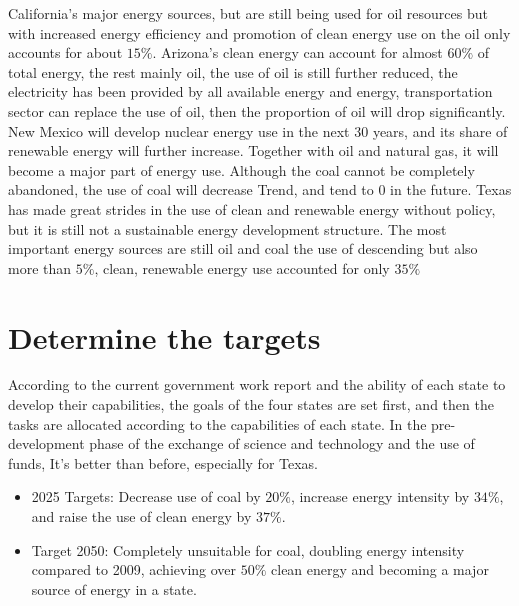 \documentclass{mcmthesis}
\begin{document}
\begin{itemize}
  California's major energy sources, but are still being used for oil resources but with increased energy efficiency and promotion of
  clean energy use on the oil only accounts for about $15\%$. Arizona's clean energy can account for almost $60\%$ of total energy,
  the rest mainly oil, the use of oil is still further reduced, the electricity has been provided by all available energy and energy,
  transportation sector can replace the use of oil, then the proportion of oil will drop significantly.
  New Mexico will develop nuclear energy use in the next 30 years, and its share of renewable energy will further increase.
  Together with oil and natural gas, it will become a major part of energy use. Although the coal cannot be completely abandoned,
  the use of coal will decrease Trend, and tend to 0 in the future.
  Texas has made great strides in the use of clean and renewable energy without policy,
  but it is still not a sustainable energy development structure.
  The most important energy sources are still oil and coal the use of descending but also more than $5\%$, clean, renewable energy use accounted for only $35\%$
\end{itemize}


\section{Determine the targets}
According to the current government work report and the ability of each state to develop their capabilities,
the goals of the four states are set first, and then the tasks are allocated according to the capabilities of each state.
In the pre-development phase of the exchange of science and technology and the use of funds, It's better than before, especially for Texas.
\begin{itemize}
  \item 2025 Targets: Decrease use of coal by $20\%$, increase energy intensity by $34\%$, and raise the use of clean energy by $37\%$.
  \item Target 2050: Completely unsuitable for coal, doubling energy intensity compared to 2009,
  achieving over $50\%$ clean energy and becoming a major source of energy in a state.
\end{itemize}
\end{document}

